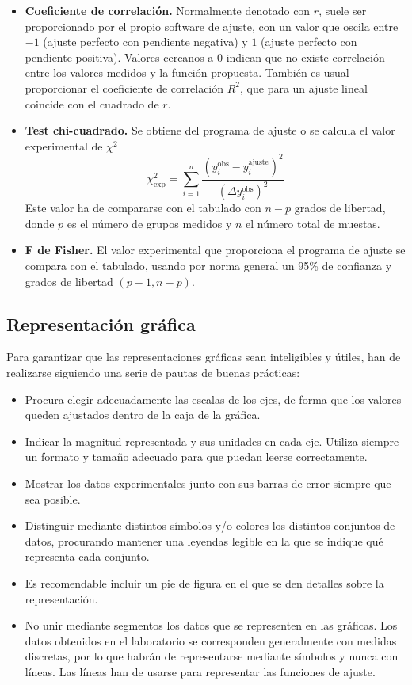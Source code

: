 \documentclass{book}
\begin{document}
\begin{itemize}
  \item \textbf{Coeficiente de correlación.} Normalmente denotado con $r$, suele ser proporcionado
  por el propio software de ajuste, con un valor que oscila entre $-1$ (ajuste perfecto con
  pendiente negativa) y $1$ (ajuste perfecto con pendiente positiva). Valores cercanos a $0$ 
  indican que no existe correlación entre los valores medidos y la función propuesta.
  También es usual proporcionar el coeficiente de correlación $R^2$, que para un ajuste lineal 
  coincide con el cuadrado de $r$.
  \item \textbf{Test chi-cuadrado.} Se obtiene del programa de ajuste o se calcula el valor
  experimental de $\chi^2$
  \begin{equation}
    \chi_{\textrm{exp}}^2 = \sum_{i=1}^n \frac{(y_i^{\textrm{obs}} - y_i^{\textrm{ajuste}})^2}{(\Delta y_i^{\textrm{obs}})^2}
  \end{equation}
  Este valor ha de compararse con el tabulado con $n-p$ grados de libertad,
  donde $p$ es el número de grupos medidos y $n$ el número total de muestas.
  \item \textbf{F de Fisher.} El valor experimental que proporciona el programa de ajuste se compara
  con el tabulado, usando por norma general un 95\% de confianza y grados de libertad $(p-1, n-p)$.
\end{itemize}


\subsection{Representación gráfica}
Para garantizar que las representaciones gráficas sean inteligibles y útiles, han de realizarse 
siguiendo una serie de pautas de buenas prácticas:

\begin{itemize}
  \item Procura elegir adecuadamente las escalas de los ejes, de forma que los valores queden
  ajustados dentro de la caja de la gráfica.
  \item Indicar la magnitud representada y sus unidades en cada eje. Utiliza siempre un formato y
  tamaño adecuado para que puedan leerse correctamente.
  \item Mostrar los datos experimentales junto con sus barras de error siempre que sea posible.
  \item Distinguir mediante distintos símbolos y/o colores los distintos conjuntos de datos,
  procurando mantener una leyendas legible en la que se indique qué representa cada conjunto.
  \item Es recomendable incluir un pie de figura en el que se den detalles sobre la representación.
  \item No unir mediante segmentos los datos que se representen en las gráficas. Los datos obtenidos
  en el laboratorio se corresponden generalmente con medidas discretas, por lo que habrán de representarse
  mediante símbolos y nunca con líneas. Las líneas han de usarse para representar las funciones de
  ajuste.
\end{itemize}
\end{document}
